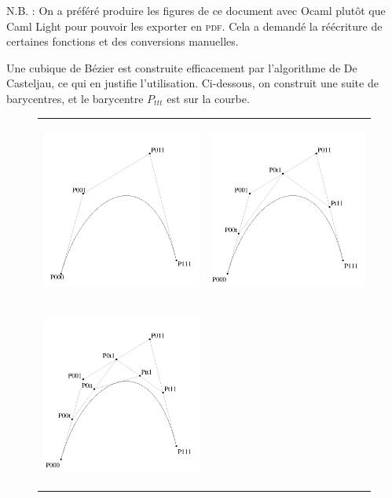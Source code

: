 \documentclass[10pt,twoside,french,a4paper]{article}
\begin{document}
N.B. : On a préféré produire les figures de ce document avec Ocaml plutôt que Caml Light pour pouvoir les exporter en \textsc{pdf}. Cela a demandé la réécriture de certaines fonctions et des conversions manuelles.

\medskip

Une cubique de Bézier est construite efficacement par l'algorithme de De Casteljau, ce qui en justifie l'utilisation. Ci-dessous, on construit une suite de barycentres, et le barycentre $P_{ttt}$ est sur la courbe.

\begin{figure}[h]
  \begin{center}
    \begin{tabular}{cc}
      \includegraphics[height=6cm]{Ressources/pdf/f1.pdf} &
      \includegraphics[height=6cm]{Ressources/pdf/f2.pdf} \\
      \includegraphics[height=6cm]{Ressources/pdf/f3.pdf} & 

\end{tabular}
\end{center}
\end{figure}
\end{document}
